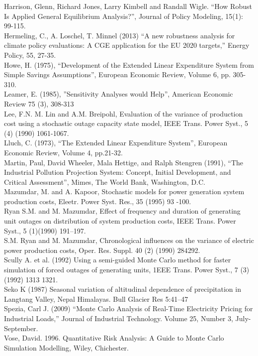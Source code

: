 \documentclass{article}
\begin{document}
Harrison, Glenn, Richard Jones, Larry Kimbell and Randall Wigle. “How Robust Is Applied General Equilibrium Analysis?”, Journal of Policy Modeling, 15(1): 99-115. \\
Hermeling, C., A. Loschel, T. Minnel (2013) “A new robustness analysis for climate policy evaluations: A CGE application for the EU 2020 targets,” Energy Policy, 55, 27-35. \\
Howe, H. (1975), “Development of the Extended Linear Expenditure System from Simple Savings Assumptions”, European Economic Review, Volume 6, pp. 305-310. \\
Leamer, E. (1985), ”Sensitivity Analyses would Help”, American Economic Review 75 (3), 308-313  \\
Lee, F.N.  M. Lin and A.M. Breipohl, Evaluation of the variance of production cost using a stochastic outage capacity state model, IEEE Trans. Power Syst., 5 (4) (1990) 1061-1067. \\
Lluch, C. (1973), “The Extended Linear Expenditure System”, European Economic Review, Volume 4, pp.21-32.\\
Martin, Paul, David Wheeler, Mala Hettige, and Ralph Stengren (1991), “The Industrial Pollution Projection System: Concept, Initial Development, and Critical Assessment”, Mimes, The World Bank, Washington, D.C. \\
Mazumdar, M.  and A. Kapoor, Stochastic models for power generation system production costs, Eleetr. Power Syst. Res., 35 (1995) 93 -100. \\
Ryan S.M.  and M. Mazumdar, Effect of frequency and duration of generating unit outages on distribution of system production costs, IEEE Trans. Power Syst., 5 (1)(1990) 191--197. \\
S.M. Ryan and M. Mazumdar, Chronological influences on the variance of electric power production costs, Oper. Res. Suppl. 40 (2) (1990) $284 $292. \\
Scully A.  et al. (1992) Using a semi-guided Monte Carlo method for faster simulation of forced outages of generating units, 1EEE Trans. Power Syst., 7 (3) (1992) 1313 1321. \\
Seko K (1987) Seasonal variation of altitudinal dependence of precipitation in Langtang Valley, Nepal Himalayas. Bull Glacier Res 5:41–47 \\
Spezia, Carl J. (2009) “Monte Carlo Analysis of Real-Time Electricity Pricing for Industrial Loads,” Journal of Industrial Technology. Volume 25, Number 3, July-September. \\
Vose, David. 1996. Quantitative Risk Analysis: A Guide to Monte Carlo Simulation Modelling, Wiley, Chichester.
\end{document}
